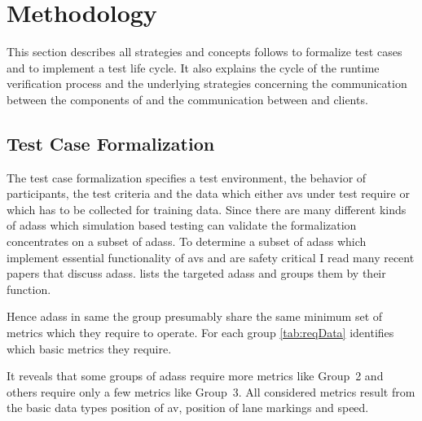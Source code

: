 \section{Methodology}\label{sec:methodology}
This section describes all strategies and concepts \drivebuild{} follows to formalize test cases and to implement a test life cycle.
It also explains the cycle of the runtime verification process and the underlying strategies concerning the communication between the components of \drivebuild{} and the communication between \drivebuild{} and clients.

\subsection{Test Case Formalization}
The test case formalization specifies a test environment, the behavior of participants, the test criteria and the data which either \glspl{av} under test require or which has to be collected \eg{} for training data.
Since there are many different kinds of \glspl{adas} which simulation based testing can validate the formalization concentrates on a subset of \glspl{adas}.
To determine a subset of \glspl{adas} which implement essential functionality of \glspl{av} and are safety critical I read many recent papers that discuss \glspl{adas}.
 lists the targeted \glspl{adas} and groups them by their function.
\begin{table}
    \centering
    \caption{%
        Target \glspl{adas} --- Lists all \glspl{adas} that the formalization aims to support.
        The \glspl{adas} are grouped based on their functionality and thus by the metrics they require to work.
    }\label{tab:targetAdas}
    \medskip
    
\end{table}
Hence \glspl{adas} in same the group presumably share the same minimum set of metrics which they require to operate.
For each group \cref{tab:reqData} identifies which basic metrics they require.
\begin{table}
    \caption{%
        Minimum required metrics --- Lists the minimal set of metrics which \glspl{adas} in the same group (see \cref{tab:targetAdas}) presumably require.
    }\label{tab:reqData}
    \medskip
    
\end{table}
It reveals that some groups of \glspl{adas} require more metrics like Group~2 and others require only a few metrics like Group~3.
All considered metrics result from the basic data types position of \gls{av}, position of lane markings and speed.
